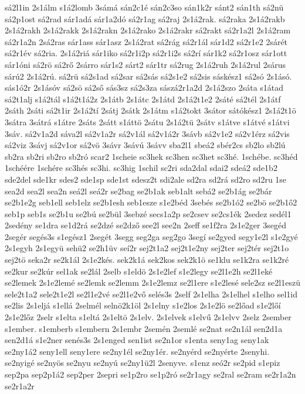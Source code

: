 {sá2l1in
2s1álm
s1á2lomb
3sámá
sán2c1é
sán2c3so
sán1k2r
sánt2
sán1th
sá2nü
sá2p1ost
sá2rad
sár1adá
sár1a2dó
sá2r1ag
sá2raj
2s1á2rak.
sá2raka
2s1á2rakb
2s1á2rakh
2s1á2rakk
2s1á2rakn
2s1á2rako
2s1á2rakr
sá2rakt
sá2r1a2l
2s1á2ram
sá2r1a2n
2sá2ras
sár1ass
sár1asz
2s1á2rat
sá2rág
sá2r1ál
sár1d2
sá2r1e2
2sárét
sá2r1év
sá2ria.
2s1á2riá
sár1iko
sá2r1i2p
sá2r1i2s
sá2rí
sár1k2
sá2r1osz
sár1ott
sár1óni
sá2rö
sá2rő
2sárro
sár1s2
sárt2
sár1tr
sá2rug
2s1á2ruh
2s1á2rul
2sárus
sárú2
2s1á2rú.
sá2rü
sá2s1ad
sá2sar
sá2sás
sá2s1e2
sá2sis
sáskész1
sá2só
2s1ásó.
sás1ó2r
2s1ásóv
sá2sö
sá2ső
sás3sz
sá2s3za
sászá2r1a2d
2s1á2szo
2sáta
s1átad
sá2t1alj
s1á2tál
s1á2t1á2z
2s1átb
2s1átc
2s1átd
2s1á2t1e2
2sáté
sá2tél
2s1átf
2sáth
2sáti
sá2t1ir
2s1á2tí
2sátj
2sátk
2s1átm
s1á2tokt
3sátor
sátókész1
2s1á2t1ö
3sátra
3sátrá
s1átre
2sáts
2sátt
s1áttö
2sátu
2s1á2tü
2sátv
s1átve
s1átvé
s1átvi
3sáv.
sá2v1a2d
sáva2l
sá2v1a2r
sá2v1ál
sá2v1á2r
3sávb
sá2v1e2
sá2v1érz
sá2vis
sá2viz
3sávj
sá2v1or
sá2vö
3sávr
3sávú
3sávv
sba2l1
sbeá2
sbér2cs
sb2lo
sb2lú
sb2ra
sb2ri
sb2ro
sb2ró
scar2
1scheie
sc3hek
sc3hen
sc3het
sc3hé.
1schébe.
sc3héd
1schéére
1schére
sc3hés
sc3hi.
sc3hig
1schil
sc2ri
sda2dal
sdai2
sdeá2
sde1b2
sde2del
sde1kr
sdes2
sde1sp
sde1st
sdesz2t
sdi2ale
sd2ra
sd2rá
sd2ro
sd2ru
1se
sea2d
sea2l
sea2n
seá2l
seá2r
se2bag
se2b1ak
seb1alt
sebá2
se2b1ág
se2bár
se2b1e2g
seb1ell
seb1elz
se2b1esh
seb1esze
s1e2béd
3sebés
se2b1ó2
se2bö
se2b1ő2
seb1p
seb1s
se2b1u
se2bú
se2bül
3sebzé
secs1a2p
se2csev
se2cs1ék
2sedez
sedél1
2sedény
se1dra
se1d2rá
se2dzé
se2dző
see2l
see2n
2seff
se1f2ra
2s1e2ger
3segéd
2segér
segés3s
s1egész1
2segét
3segg
seg2ga
seg2go
3segí
se2gyed
segy1e2l
s1e2gyé
2s1egyh
2s1együ
sehü2
se2h1üv
seí2r
sej2t1a2
sej2t1e2ny
sej2ter
sej2tér
sej2t1o
sej2tö
seka2r
se2k1ál
2s1e2kés.
sek2k1á
sek2kos
sek2k1ö
se1klu
se1k2ra
se1k2ré
se2kur
se2kúr
sel1ak
se2lál
2selb
s1eldö
2s1e2lef
s1e2legy
se2l1e2h
se2l1eké
se2lemek
2s1e2lemé
se2lemk
se2lemm
2s1e2lemz
se2l1ere
s1e2lesé
sele2sz
se2l1eszü
sele2t1a2
sele2t1e2l
se2l1e2vé
se2l1e2vő
selés3s
2self
2s1elha
2s1elhel
s1elho
sel1id
se2lis
2s1eljá
s1ellá
2selmél
selnö2k1öl
2s1elny
s1e2los
2s1e2lö
se2lőad
s1e2lőí
2s1e2lőz
2selr
s1elta
s1eltá
2s1eltö
2s1elv.
2s1elvek
s1elvű
2s1elvv
2selz
2sember
s1ember.
s1emberb
s1embern
2s1embr
2semén
2semlé
se2nat
se2n1ál
sen2d1a
sen2d1á
s1e2ner
senés3s
2s1enged
sen1ist
se2n1or
s1enta
seny1ag
seny1ak
se2ny1á2
seny1ell
seny1ere
se2ny1él
se2ny1ér.
se2nyérd
se2nyérte
2senyhi.
se2nyigé
se2nyös
se2nyu
se2nyú
se2ny1ü2l
2senyve.
s1enz
seó2r
se2pid
s1epiz
sep2pa
sep2p1á2
sep2per
2sepri
se1p2ro
se1p2ró
se2r1agy
se2ral
se2ram
se2r1a2n
se2r1a2r
}
